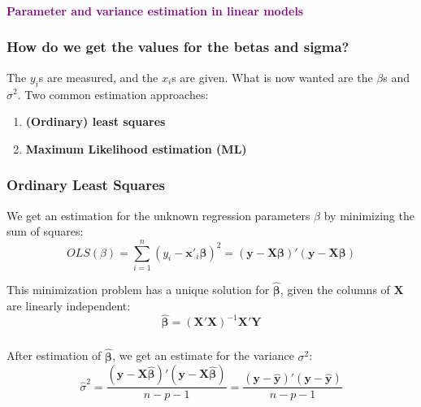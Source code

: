\documentclass{beamer}
\begin{document}
\begin{frame}
    \frametitle{}
    \begin{center}
        \huge\textbf{\textcolor{purple}{Parameter and variance estimation in linear models}}
    \end{center}
\end{frame}

\begin{frame}
    \frametitle{How do we get the values for the betas and sigma?}
    The $y_i$s are measured, and the $x_i$s are given. What is now wanted are the $\beta$s and $\sigma^2$. Two common estimation approaches:
    \begin{enumerate}
        \item \textbf{(Ordinary) least squares}
        \item \textbf{Maximum Likelihood estimation (ML)}
    \end{enumerate}
\end{frame}

\begin{frame}
    \frametitle{Ordinary Least Squares}
    We get an estimation for the unknown regression parameters $\beta$ by minimizing the sum of squares:
    \begin{equation*}
        OLS(\beta) = \sum_{i=1}^{n} (y_i - \mathbf{x}'_i \mathbf{\beta})^2 = (\mathbf{y} - \mathbf{X \beta})'(\mathbf{y} - \mathbf{X \beta})
    \end{equation*}
    \vspace{0.5cm}
    
    This minimization problem has a unique solution for $\mathbf{\hat{\beta}}$, given the columns of $\mathbf{X}$ are linearly independent:
    \begin{equation*}
        \mathbf{\hat{\beta}} = (\mathbf{X}'\mathbf{X})^{-1} \mathbf{X}'\mathbf{Y}
    \end{equation*}
\end{frame}

\begin{frame}
    \frametitle{}
    After estimation of $\mathbf{\hat{\beta}}$, we get an estimate for the variance $\sigma^2$:
    \begin{equation*}
        \hat{\sigma}^2 = \frac{(\mathbf{y} - \mathbf{X} \mathbf{\hat{\beta}})' (\mathbf{y} - \mathbf{X} \mathbf{\hat{\beta}})}{n-p-1} = \frac{(\mathbf{y} - \hat{\mathbf{y}})' (\mathbf{y} - \hat{\mathbf{y}})}{n-p-1}
    \end{equation*}
\end{frame}
\end{document}
